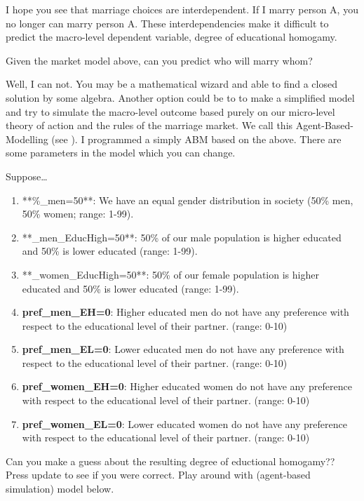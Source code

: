 \documentclass[
]{book}
\providecommand{\tightlist}{%
  \setlength{\itemsep}{0pt}\setlength{\parskip}{0pt}}
\begin{document}
I hope you see that marriage choices are interdependent. If I marry person A, you no longer can marry person A.
These interdependencies make it difficult to predict the macro-level dependent variable, degree of educational homogamy.~

Given the market model above, can you predict who will marry whom?

Well, I can not. You may be a mathematical wizard and able to find a closed solution by some algebra. Another option could be to to make a simplified model and try to simulate the macro-level outcome based purely on our micro-level theory of action and the rules of the marriage market. We call this Agent-Based-Modelling (see ). I programmed a simply ABM based on the above. There are some parameters in the model which you can change.

Suppose\ldots{}

\begin{enumerate}
\def\labelenumi{\arabic{enumi}.}
\tightlist
\item
  **\%\_men=50**: We have an equal gender distribution in society (50\% men, 50\% women; range: 1-99).\\
\item
  **\_men\_EducHigh=50**: 50\% of our male population is higher educated and 50\% is lower educated (range: 1-99).\\
\item
  **\_women\_EducHigh=50**: 50\% of our female population is higher educated and 50\% is lower educated (range: 1-99).\\
\item
  \textbf{pref\_men\_EH=0}: Higher educated men do not have any preference with respect to the educational level of their partner. (range: 0-10)
\item
  \textbf{pref\_men\_EL=0}: Lower educated men do not have any preference with respect to the educational level of their partner. (range: 0-10)
\item
  \textbf{pref\_women\_EH=0}: Higher educated women do not have any preference with respect to the educational level of their partner. (range: 0-10)
\item
  \textbf{pref\_women\_EL=0}: Lower educated women do not have any preference with respect to the educational level of their partner. (range: 0-10)
\end{enumerate}

Can you make a guess about the resulting degree of eductional homogamy?? Press update to see if you were correct.
Play around with (agent-based simulation) model below.
\end{document}
